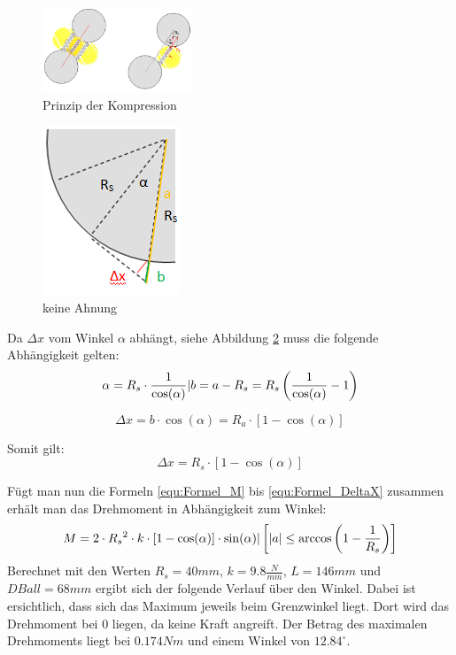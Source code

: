 \begin{figure}[h!]
	\centering
	\includegraphics[width=0.4\textwidth]{Enddokumentation/Anhang/Bilder/PrinzipKompression.png}
	\caption{Prinzip der Kompression}
	\label{fig:PrinzipBallKomp}
\end{figure}

\begin{figure}
    \includegraphics[scale=0.75]{Enddokumentation/Anhang/Bilder/GrafikKreisErkaerung.png}
    \centering
    \caption{keine Ahnung}
    \label{abb:KreisErkaerung}
\end{figure}
Da $\Delta x$ vom Winkel $\alpha$ abhängt, siehe Abbildung \ref{abb:KreisErkaerung} muss die
folgende Abhängigkeit gelten:
\begin{equation}  
	\alpha = R_s \cdot \frac{1}{\cos(\alpha)} \\ \lvert \\ b = a - R_s = R_s \left( \frac{1}{\cos(\alpha)}-1\right)   
\end{equation}

\begin{equation}
	\Delta x = b \cdot \cos(\alpha) = R_a \cdot \left[1 - \cos(\alpha)\right]
\end{equation}

Somit gilt:
\begin{equation} 	\Delta x =  R_s \cdot \left[1 - \cos(\alpha)\right]
	\label{equ:Formel_DeltaX}
\end{equation}

Fügt man nun die Formeln \ref{equ:Formel_M} bis \ref{equ:Formel_DeltaX} zusammen erhält man
das Drehmoment in Abhängigkeit zum Winkel:
\begin{equation}  
    M = 2 \cdot R_s{^{2}} \cdot k \cdot \left[1 - \cos(\alpha)\right] \cdot \sin(\alpha)\\\lvert\\ \left[ |a| \leq \arccos \left(1-\frac{1}{R_s}\right)\right]
\end{equation}
Berechnet mit den Werten $R_s = 40 mm$, $k = 9.8 \frac{N}{mm}$, $L = 146 mm$ und
$DBall = 68 mm$ ergibt sich der folgende Verlauf über den Winkel. Dabei ist ersichtlich,
dass sich das Maximum jeweils beim Grenzwinkel liegt. Dort wird das Drehmoment bei 0 liegen,
da keine Kraft angreift. Der Betrag des maximalen Drehmoments liegt bei $0.174 Nm$ und einem
Winkel von $12.84^\circ$.

